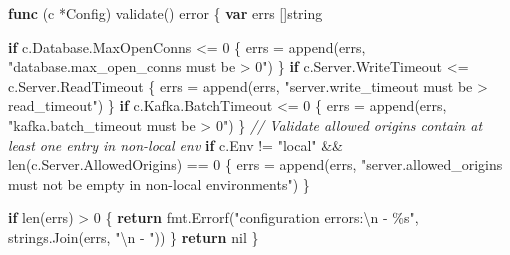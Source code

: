 \documentclass[
]{article}
\newenvironment{Shaded}{}{}
\newcommand{\BuiltInTok}[1]{\textcolor[rgb]{0.00,0.50,0.00}{#1}}
\newcommand{\CharTok}[1]{\textcolor[rgb]{0.25,0.44,0.63}{#1}}
\newcommand{\CommentTok}[1]{\textcolor[rgb]{0.38,0.63,0.69}{\textit{#1}}}
\newcommand{\ControlFlowTok}[1]{\textcolor[rgb]{0.00,0.44,0.13}{\textbf{#1}}}
\newcommand{\DataTypeTok}[1]{\textcolor[rgb]{0.56,0.13,0.00}{#1}}
\newcommand{\DecValTok}[1]{\textcolor[rgb]{0.25,0.63,0.44}{#1}}
\newcommand{\KeywordTok}[1]{\textcolor[rgb]{0.00,0.44,0.13}{\textbf{#1}}}
\newcommand{\NormalTok}[1]{#1}
\newcommand{\OperatorTok}[1]{\textcolor[rgb]{0.40,0.40,0.40}{#1}}
\newcommand{\OtherTok}[1]{\textcolor[rgb]{0.00,0.44,0.13}{#1}}
\newcommand{\StringTok}[1]{\textcolor[rgb]{0.25,0.44,0.63}{#1}}
\begin{document}
\begin{Shaded}
\begin{Highlighting}[]
\KeywordTok{func} \OperatorTok{(}\NormalTok{c }\OperatorTok{*}\NormalTok{Config}\OperatorTok{)}\NormalTok{ validate}\OperatorTok{()} \DataTypeTok{error} \OperatorTok{\{}
    \KeywordTok{var}\NormalTok{ errs }\OperatorTok{[]}\DataTypeTok{string}

    \ControlFlowTok{if}\NormalTok{ c}\OperatorTok{.}\NormalTok{Database}\OperatorTok{.}\NormalTok{MaxOpenConns }\OperatorTok{\textless{}=} \DecValTok{0} \OperatorTok{\{}
\NormalTok{        errs }\OperatorTok{=} \BuiltInTok{append}\OperatorTok{(}\NormalTok{errs}\OperatorTok{,} \StringTok{"database.max\_open\_conns must be \textgreater{} 0"}\OperatorTok{)}
    \OperatorTok{\}}
    \ControlFlowTok{if}\NormalTok{ c}\OperatorTok{.}\NormalTok{Server}\OperatorTok{.}\NormalTok{WriteTimeout }\OperatorTok{\textless{}=}\NormalTok{ c}\OperatorTok{.}\NormalTok{Server}\OperatorTok{.}\NormalTok{ReadTimeout }\OperatorTok{\{}
\NormalTok{        errs }\OperatorTok{=} \BuiltInTok{append}\OperatorTok{(}\NormalTok{errs}\OperatorTok{,} \StringTok{"server.write\_timeout must be \textgreater{} read\_timeout"}\OperatorTok{)}
    \OperatorTok{\}}
    \ControlFlowTok{if}\NormalTok{ c}\OperatorTok{.}\NormalTok{Kafka}\OperatorTok{.}\NormalTok{BatchTimeout }\OperatorTok{\textless{}=} \DecValTok{0} \OperatorTok{\{}
\NormalTok{        errs }\OperatorTok{=} \BuiltInTok{append}\OperatorTok{(}\NormalTok{errs}\OperatorTok{,} \StringTok{"kafka.batch\_timeout must be \textgreater{} 0"}\OperatorTok{)}
    \OperatorTok{\}}
    \CommentTok{// Validate allowed origins contain at least one entry in non{-}local env}
    \ControlFlowTok{if}\NormalTok{ c}\OperatorTok{.}\NormalTok{Env }\OperatorTok{!=} \StringTok{"local"} \OperatorTok{\&\&} \BuiltInTok{len}\OperatorTok{(}\NormalTok{c}\OperatorTok{.}\NormalTok{Server}\OperatorTok{.}\NormalTok{AllowedOrigins}\OperatorTok{)} \OperatorTok{==} \DecValTok{0} \OperatorTok{\{}
\NormalTok{        errs }\OperatorTok{=} \BuiltInTok{append}\OperatorTok{(}\NormalTok{errs}\OperatorTok{,} \StringTok{"server.allowed\_origins must not be empty in non{-}local environments"}\OperatorTok{)}
    \OperatorTok{\}}

    \ControlFlowTok{if} \BuiltInTok{len}\OperatorTok{(}\NormalTok{errs}\OperatorTok{)} \OperatorTok{\textgreater{}} \DecValTok{0} \OperatorTok{\{}
        \ControlFlowTok{return}\NormalTok{ fmt}\OperatorTok{.}\NormalTok{Errorf}\OperatorTok{(}\StringTok{"configuration errors:}\CharTok{\textbackslash{}n}\StringTok{  {-} \%s"}\OperatorTok{,}\NormalTok{ strings}\OperatorTok{.}\NormalTok{Join}\OperatorTok{(}\NormalTok{errs}\OperatorTok{,} \StringTok{"}\CharTok{\textbackslash{}n}\StringTok{  {-} "}\OperatorTok{))}
    \OperatorTok{\}}
    \ControlFlowTok{return} \OtherTok{nil}
\OperatorTok{\}}
\end{Highlighting}
\end{Shaded}
\end{document}
